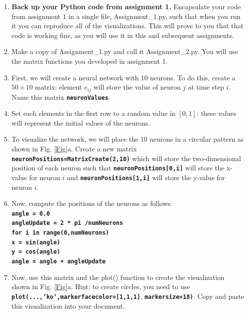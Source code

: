 \documentclass[12pt]{article}
\begin{document}
\begin{enumerate}

\item \textbf{Back up your Python code from assignment 1.} Encapsulate your code from assignment 1 in a single file, Assignment\_1.py, such that when you run it you can reproduce all of the visualizations. This will prove to you that that code is working fine, as you will use it in this and subsequent assignments.

\item Make a copy of Assignment\_1.py and call it Assignment\_2.py. You will use the matrix functions you developed in assignment 1. 

\item First, we will create a neural network with 10 neurons. To do this, create a $50 \times 10$ matrix: element $e_{ij}$ will store the value of neuron $j$ at time step $i$. Name this matrix \textbf{\texttt{neuronValues}}.

\item Set each elements in the first row to a random value in $[0,1]$: these values will represent the initial values of the neurons.

\item To visualize the network, we will place the 10 neurons in a circular pattern as shown in Fig. \ref{Fig}a. Create a new matrix \textbf{\texttt{neuronPositions=MatrixCreate(2,10)}} which will store the two-dimensional position of each neuron such that \textbf{\texttt{neuronPositions[0,i]}} will store the x-value for neuron $i$ and \textbf{\texttt{neuronPositions[1,i]}} will store the y-value for neuron $i$.

\item Now, compute the positions of the neurons as follows:\\
\textbf{\texttt{angle = 0.0}}\\
\textbf{\texttt{angleUpdate = 2 * pi /numNeurons}}\\
\textbf{\texttt{for i in range(0,numNeurons)}}\\
\indent \textbf{\texttt{\hspace{1cm}x = sin(angle)}}\\
\indent \textbf{\texttt{\hspace{1cm}y = cos(angle)}}\\
\indent \textbf{\texttt{\hspace{1cm}angle = angle + angleUpdate}}\\

\item Now, use this matrix and the plot() function to create the visualization shown in Fig. \ref{Fig}a. Hint: to create circles, you need to use \textbf{\texttt{plot(...,'ko',markerfacecolor=[1,1,1]}}, \textbf{\texttt{markersize=18)}}. Copy and paste this visualization into your document.


\end{enumerate}
\end{document}
